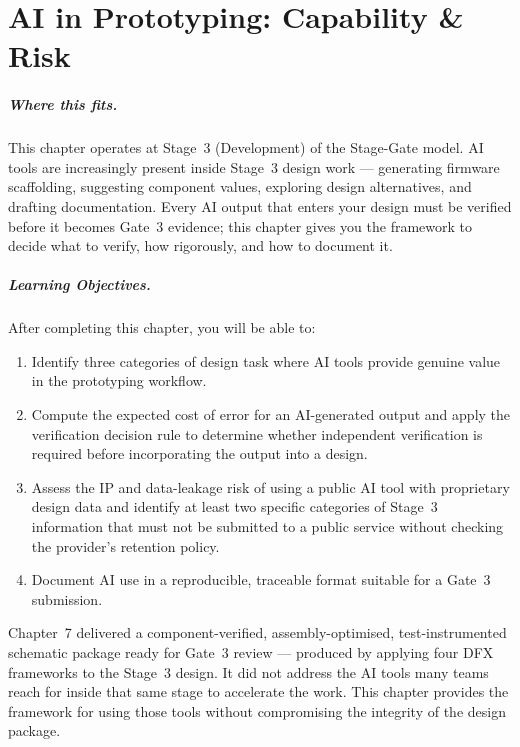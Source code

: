 \chapter{AI in Prototyping: Capability \& Risk}
\label{ch8}

\paragraph{Where this fits.}
This chapter operates at Stage~3 (Development) of the Stage-Gate model.
AI tools are increasingly present inside Stage~3 design work --- generating
firmware scaffolding, suggesting component values, exploring design alternatives,
and drafting documentation.
Every AI output that enters your design must be verified before it becomes
Gate~3 evidence; this chapter gives you the framework to decide what to verify,
how rigorously, and how to document it.

\paragraph{Learning Objectives.}
After completing this chapter, you will be able to:
\begin{enumerate}
  \item Identify three categories of design task where AI tools provide
        genuine value in the prototyping workflow.
  \item Compute the expected cost of error for an AI-generated output and
        apply the verification decision rule to determine whether independent
        verification is required before incorporating the output into a design.
  \item Assess the IP and data-leakage risk of using a public AI tool with
        proprietary design data and identify at least two specific categories
        of Stage~3 information that must not be submitted to a public service
        without checking the provider's retention policy.
  \item Document AI use in a reproducible, traceable format suitable for a
        Gate~3 submission.
\end{enumerate}

Chapter~7 delivered a component-verified, assembly-optimised, test-instrumented
schematic package ready for Gate~3 review --- produced by applying four DFX
frameworks to the Stage~3 design.
It did not address the AI tools many teams reach for inside that same stage to
accelerate the work.
This chapter provides the framework for using those tools without compromising
the integrity of the design package.

